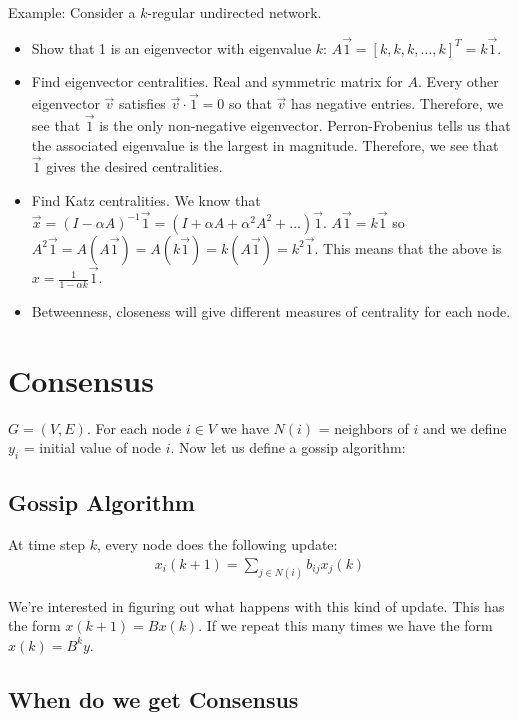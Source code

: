 \documentclass[psamsfonts]{amsart}
\begin{document}
Example: Consider a $k$-regular undirected network.
\begin{itemize}
  \item Show that 1 is an eigenvector with eigenvalue $k$: $A \vec{1} = [k, k, k, \ldots, k]^T = k \vec{1}$.
  \item Find eigenvector centralities. Real and symmetric matrix for $A$. Every other eigenvector $\vec{v}$ satisfies $\vec{v} \cdot \vec{1} = 0$ so that $\vec{v}$ has negative entries. Therefore, we see that $\vec{1}$ is the only non-negative eigenvector. Perron-Frobenius tells us that the associated eigenvalue is the largest in magnitude. Therefore, we see that $\vec{1}$ gives the desired centralities.
  \item Find Katz centralities. We know that $\vec{x} = (I - \alpha A)^{-1} \vec{1} = (I + \alpha A + \alpha^2 A^2 + \ldots) \vec{1}$. $A \vec{1} = k \vec{1}$ so $A^2 \vec{1} = A (A \vec{1}) = A (k \vec{1}) = k (A \vec{1}) = k^2 \vec{1}$. This means that the above is $x = \frac{1}{1 - \alpha k} \vec{1}$.
  \item Betweenness, closeness will give different measures of centrality for each node.
\end{itemize}

\section{Consensus}

$G = (V, E)$. For each node $i \in V$ we have $N(i)$ = neighbors of $i$ and we define $y_i$ = initial value of node $i$. Now let us define a gossip algorithm:

\subsection{Gossip Algorithm}

At time step $k$, every node does the following update:
\begin{eqnarray}
  x_i(k+1) = \sum_{j \in N(i)} b_{ij} x_j(k)
\end{eqnarray}

We're interested in figuring out what happens with this kind of update. This has the form $x(k+1) = B x(k)$. If we repeat this many times we have the form $x(k) = B^k y$.

\subsection{When do we get Consensus}
\end{document}
